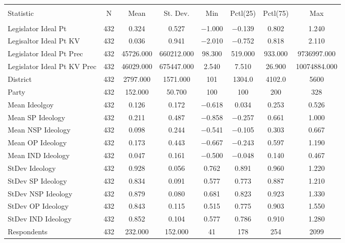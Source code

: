 
\begin{sidewaystable}[!htbp] \centering 
  \caption{} 
  \label{} 
\begin{tabular}{@{\extracolsep{5pt}}lccccccc} 
\\[-1.8ex]\hline \\[-1.8ex] 
Statistic & \multicolumn{1}{c}{N} & \multicolumn{1}{c}{Mean} & \multicolumn{1}{c}{St. Dev.} & \multicolumn{1}{c}{Min} & \multicolumn{1}{c}{Pctl(25)} & \multicolumn{1}{c}{Pctl(75)} & \multicolumn{1}{c}{Max} \\ 
\hline \\[-1.8ex] 
Legislator Ideal Pt & 432 & 0.324 & 0.527 & $-$1.000 & $-$0.139 & 0.802 & 1.240 \\ 
Legisaltor Ideal Pt KV & 432 & 0.036 & 0.941 & $-$2.010 & $-$0.752 & 0.818 & 2.110 \\ 
Legislator Ideal Pt Prec & 432 & 45726.000 & 660212.000 & 98.300 & 519.000 & 933.000 & 9736997.000 \\ 
Legislator Ideal Pt KV Prec & 432 & 46029.000 & 675447.000 & 2.540 & 7.510 & 26.900 & 10074884.000 \\ 
District & 432 & 2797.000 & 1571.000 & 101 & 1304.0 & 4102.0 & 5600 \\ 
Party & 432 & 152.000 & 50.700 & 100 & 100 & 200 & 328 \\ 
Mean Ideolgoy & 432 & 0.126 & 0.172 & $-$0.618 & 0.034 & 0.253 & 0.526 \\ 
Mean SP Ideology & 432 & 0.211 & 0.487 & $-$0.858 & $-$0.257 & 0.661 & 1.000 \\ 
Mean NSP Ideology & 432 & 0.098 & 0.244 & $-$0.541 & $-$0.105 & 0.303 & 0.667 \\ 
Mean OP Ideology & 432 & 0.173 & 0.443 & $-$0.667 & $-$0.243 & 0.597 & 1.190 \\ 
Mean IND Ideology & 432 & 0.047 & 0.161 & $-$0.500 & $-$0.048 & 0.140 & 0.467 \\ 
StDev Ideology & 432 & 0.928 & 0.056 & 0.762 & 0.891 & 0.960 & 1.220 \\ 
StDev SP Ideology & 432 & 0.834 & 0.091 & 0.577 & 0.773 & 0.887 & 1.210 \\ 
StDev NSP Ideology & 432 & 0.879 & 0.080 & 0.681 & 0.823 & 0.923 & 1.330 \\ 
StDev OP Ideology & 432 & 0.843 & 0.115 & 0.515 & 0.775 & 0.903 & 1.550 \\ 
StDev IND Ideology & 432 & 0.852 & 0.104 & 0.577 & 0.786 & 0.910 & 1.280 \\ 
Respondents & 432 & 232.000 & 152.000 & 41 & 178 & 254 & 2099 \\ 

\end{tabular}
\end{sidewaystable}
